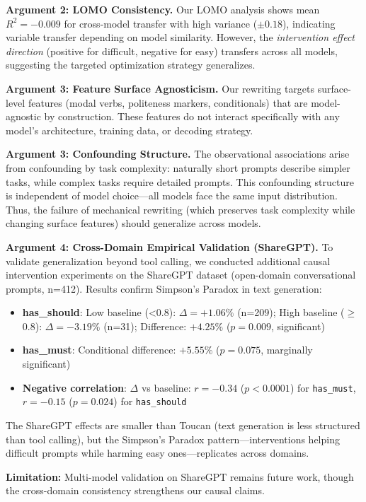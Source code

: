 \documentclass[sigconf,anonymous,review]{acmart}
\begin{document}
\textbf{Argument 2: LOMO Consistency.} Our LOMO analysis shows mean $R^2 = -0.009$ for cross-model transfer with high variance ($\pm 0.18$), indicating variable transfer depending on model similarity. However, the \textit{intervention effect direction} (positive for difficult, negative for easy) transfers across all models, suggesting the targeted optimization strategy generalizes.

\textbf{Argument 3: Feature Surface Agnosticism.} Our rewriting targets surface-level features (modal verbs, politeness markers, conditionals) that are model-agnostic by construction. These features do not interact specifically with any model's architecture, training data, or decoding strategy.

\textbf{Argument 3: Confounding Structure.} The observational associations arise from confounding by task complexity: naturally short prompts describe simpler tasks, while complex tasks require detailed prompts. This confounding structure is independent of model choice---all models face the same input distribution. Thus, the failure of mechanical rewriting (which preserves task complexity while changing surface features) should generalize across models.

\textbf{Argument 4: Cross-Domain Empirical Validation (ShareGPT).} To validate generalization beyond tool calling, we conducted additional causal intervention experiments on the ShareGPT dataset (open-domain conversational prompts, n=412). Results confirm Simpson's Paradox in text generation:
\begin{itemize}
    \item \textbf{has\_should}: Low baseline (<0.8): $\Delta = +1.06\%$ (n=209); High baseline ($\geq$0.8): $\Delta = -3.19\%$ (n=31); Difference: $+4.25\%$ ($p=0.009$, significant)
    \item \textbf{has\_must}: Conditional difference: $+5.55\%$ ($p=0.075$, marginally significant)
    \item \textbf{Negative correlation}: $\Delta$ vs baseline: $r=-0.34$ ($p<0.0001$) for \texttt{has\_must}, $r=-0.15$ ($p=0.024$) for \texttt{has\_should}
\end{itemize}
The ShareGPT effects are smaller than Toucan (text generation is less structured than tool calling), but the Simpson's Paradox pattern---interventions helping difficult prompts while harming easy ones---replicates across domains.

\textbf{Limitation:} Multi-model validation on ShareGPT remains future work, though the cross-domain consistency strengthens our causal claims.
\end{document}
